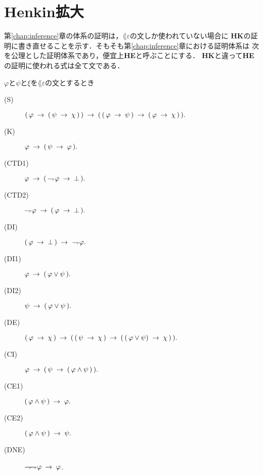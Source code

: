 \section{Henkin拡大}
	第\ref{chap:inference}章の体系の証明は，$\lang{\varepsilon}$の文しか使われていない場合に
	{\bf HK}の証明に書き直せることを示す．そもそも第\ref{chap:inference}章における証明体系は
	次を公理とした証明体系であり，便宜上{\bf HE}と呼ぶことにする．
	{\bf HK}と違って{\bf HE}の証明に使われる式は全て文である．
	\begin{screen}
		\begin{logicalaxm}
			$\varphi$と$\psi$と$\xi$を$\lang{\varepsilon}$の文とするとき
			\begin{description}
				\item[(S)] $(\, \varphi \rarrow (\, \psi \rarrow \chi\, )\, ) 
					\rarrow (\, (\, \varphi \rarrow \psi\, )
					\rarrow (\, \varphi \rarrow \chi\, )\, ).$
				\item[(K)] $\varphi \rarrow (\, \psi \rarrow \varphi\, ).$
				\item[(CTD1)] $\varphi \rarrow (\, \negation \varphi \rarrow \bot\, ).$
				\item[(CTD2)] $\negation \varphi \rarrow (\, \varphi \rarrow \bot\, ).$
				\item[(DI)] $(\, \varphi \rarrow \bot\, ) \rarrow\ \negation \varphi.$
				\item[(DI1)] $\varphi \rarrow (\, \varphi \vee \psi\, ).$
				\item[(DI2)] $\psi \rarrow (\, \varphi \vee \psi\, ).$
				\item[(DE)] $(\, \varphi \rarrow \chi\, ) \rarrow 
					(\, (\, \psi \rarrow \chi\, ) 
					\rarrow (\, (\, \varphi \vee \psi) \rarrow \chi\, )\, ).$
				\item[(CI)] $\varphi \rarrow (\, \psi \rarrow (\, \varphi \wedge \psi\, )\, ).$
				\item[(CE1)] $(\, \varphi \wedge \psi\, ) \rarrow \varphi.$
				\item[(CE2)] $(\, \varphi \wedge \psi\, ) \rarrow \psi.$
				\item[(DNE)] $\negation \negation \varphi \rarrow \varphi$.
			\end{description}
		\end{logicalaxm}
	\end{screen}
	
